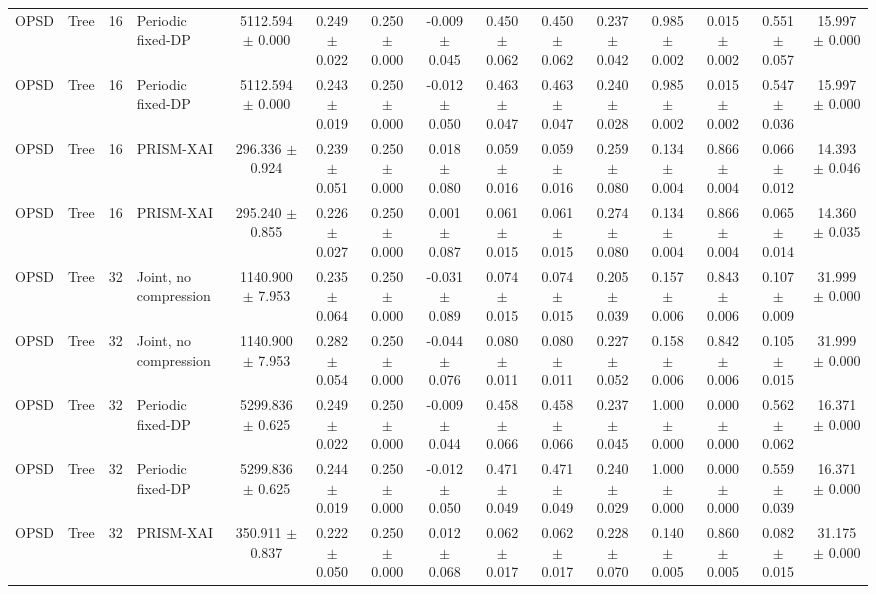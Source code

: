 \begin{tabular}{llllccccccccccc}
OPSD & Tree & 16 & Periodic fixed-DP & 5112.594 $\pm$ 0.000 & 0.249 $\pm$ 0.022 & 0.250 $\pm$ 0.000 & -0.009 $\pm$ 0.045 & 0.450 $\pm$ 0.062 & 0.450 $\pm$ 0.062 & 0.237 $\pm$ 0.042 & 0.985 $\pm$ 0.002 & 0.015 $\pm$ 0.002 & 0.551 $\pm$ 0.057 & 15.997 $\pm$ 0.000 \\
OPSD & Tree & 16 & Periodic fixed-DP & 5112.594 $\pm$ 0.000 & 0.243 $\pm$ 0.019 & 0.250 $\pm$ 0.000 & -0.012 $\pm$ 0.050 & 0.463 $\pm$ 0.047 & 0.463 $\pm$ 0.047 & 0.240 $\pm$ 0.028 & 0.985 $\pm$ 0.002 & 0.015 $\pm$ 0.002 & 0.547 $\pm$ 0.036 & 15.997 $\pm$ 0.000 \\
OPSD & Tree & 16 & PRISM-XAI & 296.336 $\pm$ 0.924 & 0.239 $\pm$ 0.051 & 0.250 $\pm$ 0.000 & 0.018 $\pm$ 0.080 & 0.059 $\pm$ 0.016 & 0.059 $\pm$ 0.016 & 0.259 $\pm$ 0.080 & 0.134 $\pm$ 0.004 & 0.866 $\pm$ 0.004 & 0.066 $\pm$ 0.012 & 14.393 $\pm$ 0.046 \\
OPSD & Tree & 16 & PRISM-XAI & 295.240 $\pm$ 0.855 & 0.226 $\pm$ 0.027 & 0.250 $\pm$ 0.000 & 0.001 $\pm$ 0.087 & 0.061 $\pm$ 0.015 & 0.061 $\pm$ 0.015 & 0.274 $\pm$ 0.080 & 0.134 $\pm$ 0.004 & 0.866 $\pm$ 0.004 & 0.065 $\pm$ 0.014 & 14.360 $\pm$ 0.035 \\
OPSD & Tree & 32 & Joint, no compression & 1140.900 $\pm$ 7.953 & 0.235 $\pm$ 0.064 & 0.250 $\pm$ 0.000 & -0.031 $\pm$ 0.089 & 0.074 $\pm$ 0.015 & 0.074 $\pm$ 0.015 & 0.205 $\pm$ 0.039 & 0.157 $\pm$ 0.006 & 0.843 $\pm$ 0.006 & 0.107 $\pm$ 0.009 & 31.999 $\pm$ 0.000 \\
OPSD & Tree & 32 & Joint, no compression & 1140.900 $\pm$ 7.953 & 0.282 $\pm$ 0.054 & 0.250 $\pm$ 0.000 & -0.044 $\pm$ 0.076 & 0.080 $\pm$ 0.011 & 0.080 $\pm$ 0.011 & 0.227 $\pm$ 0.052 & 0.158 $\pm$ 0.006 & 0.842 $\pm$ 0.006 & 0.105 $\pm$ 0.015 & 31.999 $\pm$ 0.000 \\
OPSD & Tree & 32 & Periodic fixed-DP & 5299.836 $\pm$ 0.625 & 0.249 $\pm$ 0.022 & 0.250 $\pm$ 0.000 & -0.009 $\pm$ 0.044 & 0.458 $\pm$ 0.066 & 0.458 $\pm$ 0.066 & 0.237 $\pm$ 0.045 & 1.000 $\pm$ 0.000 & 0.000 $\pm$ 0.000 & 0.562 $\pm$ 0.062 & 16.371 $\pm$ 0.000 \\
OPSD & Tree & 32 & Periodic fixed-DP & 5299.836 $\pm$ 0.625 & 0.244 $\pm$ 0.019 & 0.250 $\pm$ 0.000 & -0.012 $\pm$ 0.050 & 0.471 $\pm$ 0.049 & 0.471 $\pm$ 0.049 & 0.240 $\pm$ 0.029 & 1.000 $\pm$ 0.000 & 0.000 $\pm$ 0.000 & 0.559 $\pm$ 0.039 & 16.371 $\pm$ 0.000 \\
OPSD & Tree & 32 & PRISM-XAI & 350.911 $\pm$ 0.837 & 0.222 $\pm$ 0.050 & 0.250 $\pm$ 0.000 & 0.012 $\pm$ 0.068 & 0.062 $\pm$ 0.017 & 0.062 $\pm$ 0.017 & 0.228 $\pm$ 0.070 & 0.140 $\pm$ 0.005 & 0.860 $\pm$ 0.005 & 0.082 $\pm$ 0.015 & 31.175 $\pm$ 0.000 \\

\end{tabular}
